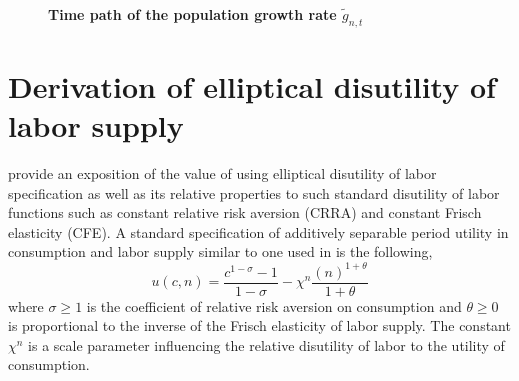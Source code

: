 \documentclass[letterpaper,12pt]{article}
\theoremstyle{definition}
\begin{document}
    \begin{figure}[htbp]\centering \captionsetup{width=4.0in}
      \caption{\label{FigGrowthPath}\textbf{Time path of the population growth rate $\tilde{g}_{n,t}$}}
    \end{figure}
    \clearpage



\newpage
\section{Derivation of elliptical disutility of labor supply}\label{AppEllipseUtil}

  \setcounter{equation}{0}

  \citet{EvansPhillips:2015} provide an exposition of the value of using elliptical disutility of labor specification as well as its relative properties to such standard disutility of labor functions such as constant relative risk aversion (CRRA) and constant Frisch elasticity (CFE). A standard specification of additively separable period utility in consumption and labor supply similar to one used in \citet{KPR:1988} is the following,
  \begin{equation}\label{AppEqStandUtil}
    u(c,n) = \frac{c^{1-\sigma} - 1}{1-\sigma} - \chi^n\frac{\left(n\right)^{1+\theta}}{1+\theta}
  \end{equation}
  where $\sigma\geq 1$ is the coefficient of relative risk aversion on consumption and $\theta\geq 0$ is proportional to the inverse of the Frisch elasticity of labor supply. The constant $\chi^n$ is a scale parameter influencing the relative disutility of labor to the utility of consumption.
\end{document}
